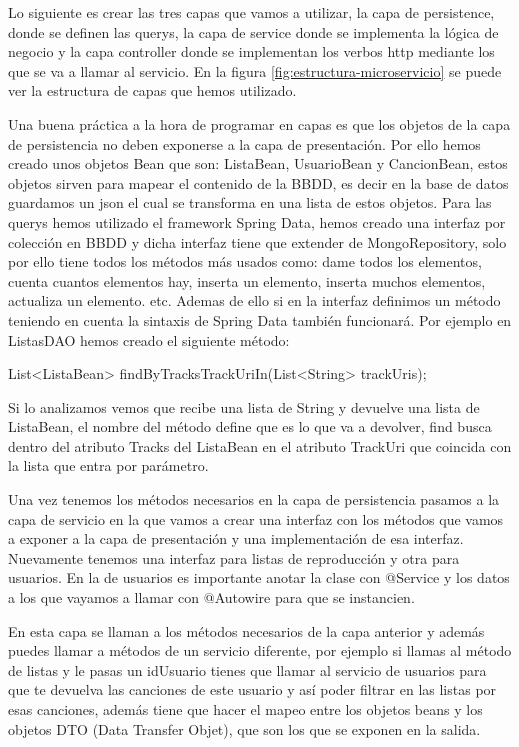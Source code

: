 \documentclass[12pt]{report} %
\begin{document}
 Lo siguiente es crear las tres capas que vamos a utilizar, la capa de persistence, donde se definen las querys, la capa de service donde se implementa la lógica de negocio y la capa controller donde se implementan los verbos http mediante los que se va a llamar al servicio. En la figura \ref{fig:estructura-microservicio} se puede ver la estructura de capas que hemos utilizado.
 
 Una buena práctica a la hora de programar en capas es que los objetos de la capa de persistencia no deben exponerse a la capa de presentación. Por ello hemos creado unos objetos Bean que son: ListaBean, UsuarioBean y CancionBean, estos objetos sirven para mapear el contenido de la BBDD, es decir en la base de datos guardamos un json el cual se transforma en una lista de estos objetos.
 Para las querys hemos utilizado el framework Spring Data, hemos creado una interfaz por colección en BBDD y dicha interfaz tiene que extender de MongoRepository, solo por ello tiene todos los métodos más usados como: dame todos los elementos, cuenta cuantos elementos hay, inserta un elemento, inserta muchos elementos, actualiza un elemento. etc. Ademas de ello si en la interfaz definimos un método teniendo en cuenta la sintaxis de Spring Data también funcionará. Por ejemplo en ListasDAO hemos creado el siguiente método:
 
 	List<ListaBean> findByTracksTrackUriIn(List<String> trackUris);
 
 Si lo analizamos vemos que recibe una lista de String y devuelve una lista de ListaBean, el nombre del método define que es lo que va a devolver, find busca dentro del atributo Tracks del ListaBean en el atributo TrackUri que coincida con la lista que entra por parámetro.
 
 Una vez tenemos los métodos necesarios en la capa de persistencia pasamos a la capa de servicio en la que vamos a crear una interfaz con los métodos que vamos a exponer a la capa de presentación y una implementación de esa interfaz. Nuevamente tenemos una interfaz para listas de reproducción y otra para usuarios. En la de usuarios es importante anotar la clase con @Service y los datos a los que vayamos a llamar con @Autowire para que se instancien.
 
 En esta capa se llaman a los métodos necesarios de la capa anterior y además puedes llamar a métodos de un servicio diferente, por ejemplo si llamas al método de listas y le pasas un idUsuario tienes que  llamar al servicio de usuarios para que te devuelva las canciones de este usuario y así poder filtrar en las listas por esas canciones, además tiene que hacer el mapeo entre los objetos beans y los objetos DTO (Data Transfer Objet), que son los que se exponen en la salida.
 
\end{document}
